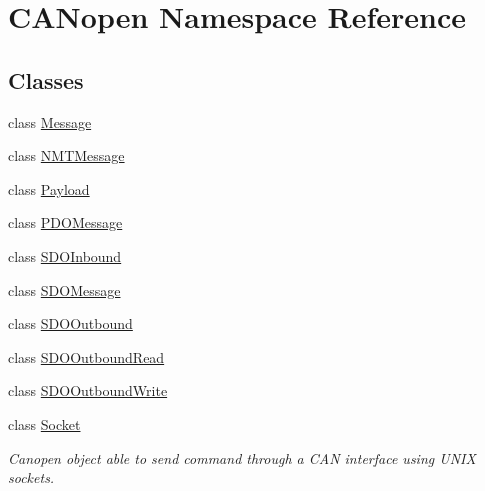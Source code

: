 \hypertarget{namespace_c_a_nopen}{}\section{C\+A\+Nopen Namespace Reference}
\label{namespace_c_a_nopen}
\subsection*{Classes}
\begin{DoxyCompactItemize}
\item 
class \hyperlink{class_c_a_nopen_1_1_message}{Message}
\item 
class \hyperlink{class_c_a_nopen_1_1_n_m_t_message}{N\+M\+T\+Message}
\item 
class \hyperlink{class_c_a_nopen_1_1_payload}{Payload}
\item 
class \hyperlink{class_c_a_nopen_1_1_p_d_o_message}{P\+D\+O\+Message}
\item 
class \hyperlink{class_c_a_nopen_1_1_s_d_o_inbound}{S\+D\+O\+Inbound}
\item 
class \hyperlink{class_c_a_nopen_1_1_s_d_o_message}{S\+D\+O\+Message}
\item 
class \hyperlink{class_c_a_nopen_1_1_s_d_o_outbound}{S\+D\+O\+Outbound}
\item 
class \hyperlink{class_c_a_nopen_1_1_s_d_o_outbound_read}{S\+D\+O\+Outbound\+Read}
\item 
class \hyperlink{class_c_a_nopen_1_1_s_d_o_outbound_write}{S\+D\+O\+Outbound\+Write}
\item 
class \hyperlink{class_c_a_nopen_1_1_socket}{Socket}
\begin{DoxyCompactList}\small\item\em Canopen object able to send command through a C\+AN interface using U\+N\+IX sockets. \end{DoxyCompactList}\end{DoxyCompactItemize}
